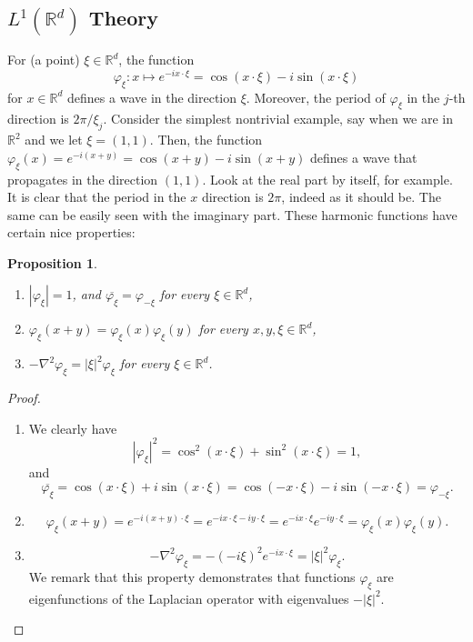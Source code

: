 \documentclass[letterpaper,twoside,12pt]{article}
\theoremstyle{mystyle}
\newtheorem{prop}{Proposition}[section]
\newcommand{\R}{{\mathbb R}}
\newcommand{\cg}{\color{gray}}
\newcommand{\cbk}{\color{black}}
\begin{document}
\subsection{$L^1\left( \R^d \right)$ Theory}

For \cg (a point) \cbk $\xi \in \R^d$, the function 
\[\varphi_\xi : x\mapsto  e^{-ix\cdot \xi} = \cos\left( x\cdot \xi  \right) - i \sin \left( x\cdot \xi \right)\] for $x \in \R^d$ defines a wave in the direction $\xi$. Moreover, the period of $\varphi_\xi$ in the $j$-th direction is $2\pi / \xi_j$. 
\cg Consider the simplest nontrivial example, say when we are in $\R^2$ and we let $\xi = \left( 1, 1 \right)$. Then, the function $\varphi_\xi (x) = e^{-i(x + y)} = \cos\left( x + y \right) - i \sin \left( x + y \right)$ defines a wave that propagates in the direction $\left( 1, 1 \right)$. Look at the real part by itself, for example. It is clear that the period in the $x$ direction is $2\pi$, indeed as it should be. The same can be easily seen with the imaginary part. \cbk These harmonic functions have certain nice properties: 

\begin{prop}
  \begin{enumerate}
    \item $\left| {{\varphi _\xi }} \right| = 1$, and $\overline{\varphi_\xi} = \varphi_{-\xi}$ for every $\xi \in \R^d$, 
    \item $\varphi_\xi \left( x + y \right) = \varphi_\xi\left( x \right)\varphi_\xi\left( y \right)$ for every $x, y, \xi\in \R^d$, 
    \item $-\nabla^2 \varphi_\xi = |\xi|^2 \varphi_\xi$ for every $\xi \in \R^d$. 
  \end{enumerate}
\end{prop}
\begin{proof}
  \begin{enumerate}
    \item We clearly have 
    \[{\left| {{\varphi _\xi }} \right|^2} = {\cos ^2}\left( {x \cdot \xi } \right) + {\sin ^2}\left( {x \cdot \xi } \right) = 1,\]
    and 
    \[\overline{\varphi_\xi}  = \cos\left( x\cdot \xi  \right) + i \sin\left( x \cdot \xi \right) = \cos\left( -x \cdot \xi \right) - i\sin\left( -x\cdot \xi \right) = \varphi_{-\xi}.\]
    \item \[\varphi_\xi \left( x + y \right) = e^{-i\left( x + y \right)\cdot \xi} = e^{-ix\cdot \xi -iy\cdot \xi} = e^{-ix\cdot \xi} e^{-iy\cdot \xi} = \varphi_\xi \left( x \right) \varphi_\xi \left( y \right).\]
    \item \[-\nabla^2 \varphi_\xi = - \left( -i\xi \right)^2 e^{-ix\cdot \xi} = |\xi|^2 \varphi_\xi.\] We remark that this property demonstrates that functions $\varphi_\xi$ are eigenfunctions of the Laplacian operator with eigenvalues $-|\xi|^2$. 
  \end{enumerate}
\end{proof}
\end{document}

